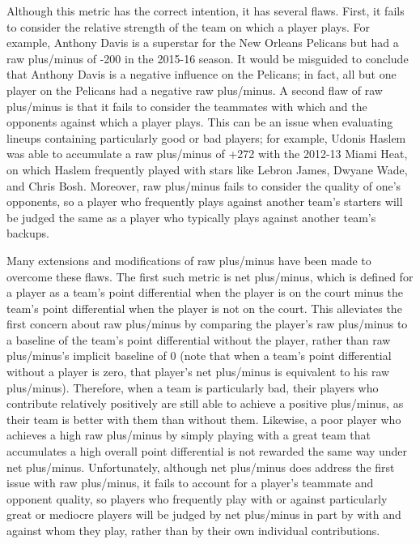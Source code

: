 Although this metric has the correct intention, it has several flaws. First, it
fails to consider the relative strength of the team on which a player plays. For
example, Anthony Davis is a superstar for the New Orleans Pelicans but had a raw
plus/minus of -200 in the 2015-16 season. It would be misguided to conclude that
Anthony Davis is a negative influence on the Pelicans; in fact, all but one player
on the Pelicans had a negative raw plus/minus. A second flaw of raw plus/minus is
that it fails to consider the teammates with which and the opponents against which a
player plays. This can be an issue when evaluating lineups containing particularly
good or bad players; for example, Udonis Haslem was able to accumulate a raw
plus/minus of +272 with the 2012-13 Miami Heat, on which Haslem frequently played
with stars like Lebron James, Dwyane Wade, and Chris Bosh. Moreover, raw plus/minus
fails to consider the quality of one's opponents, so a player who frequently plays
against another team's starters will be judged the same as a player who typically
plays against another team's backups.

Many extensions and modifications of raw plus/minus have been made to overcome these
flaws. The first such metric is net plus/minus, which is defined for a player as a
team's point differential when the player is on the court minus the team's point
differential when the player is not on the court. This alleviates the first concern
about raw plus/minus by comparing the player's raw plus/minus to a baseline of the
team's point differential without the player, rather than raw plus/minus's implicit
baseline of 0 (note that when a team's point differential without a player is zero,
that player's net plus/minus is equivalent to his raw plus/minus). Therefore, when a
team is particularly bad, their players who contribute relatively positively are
still able to achieve a positive plus/minus, as their team is better with them than
without them. Likewise, a poor player who achieves a high raw plus/minus by simply
playing with a great team that accumulates a high overall point differential is not
rewarded the same way under net plus/minus. Unfortunately, although net plus/minus
does address the first issue with raw plus/minus, it fails to account for a player's
teammate and opponent quality, so players who frequently play with or against
particularly great or mediocre players will be judged by net plus/minus in part by
with and against whom they play, rather than by their own individual contributions.

